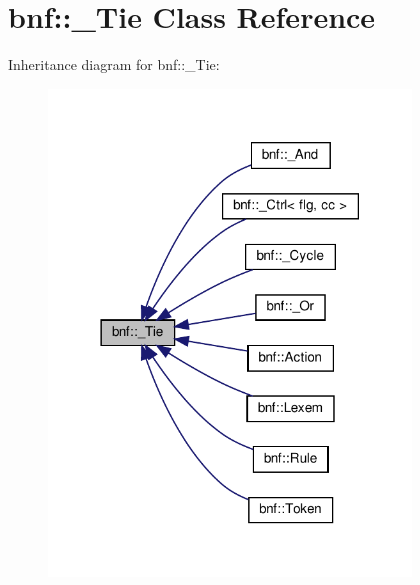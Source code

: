 \section{bnf\+:\+:\+\_\+\+Tie Class Reference}
\label{classbnf_1_1___tie}


Inheritance diagram for bnf\+:\+:\+\_\+\+Tie\+:
\nopagebreak
\begin{figure}[H]
\begin{center}
\leavevmode
\includegraphics[width=273pt]{classbnf_1_1___tie__inherit__graph}
\end{center}
\end{figure}
